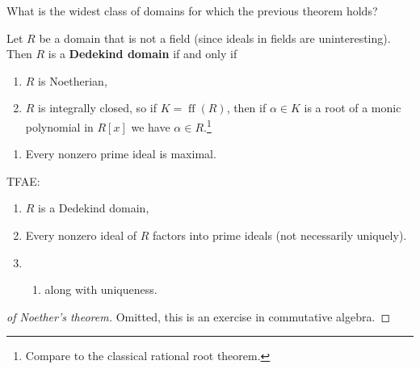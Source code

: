\begin{question}

What is the widest class of domains for which the previous theorem
holds?

\end{question}

\begin{definition}

Let \(R\) be a domain that is not a field (since ideals in fields are
uninteresting). Then \(R\) is a \textbf{Dedekind domain} if and only if

\begin{enumerate}
\def\labelenumi{\alph{enumi}.}
\item
  \(R\) is Noetherian,
\item
  \(R\) is integrally closed, so if \(K = \operatorname{ff}(R)\), then
  if \(\alpha\in K\) is a root of a monic polynomial in \(R[x]\) we have
  \(\alpha\in R\).\footnote{Compare to the classical rational root
    theorem.}
\end{enumerate}

\begin{enumerate}
\def\labelenumi{\alph{enumi}.}
\setcounter{enumi}{2}
\tightlist
\item
  Every nonzero prime ideal is maximal.
\end{enumerate}

\end{definition}

\begin{theorem}[Noether]

TFAE:

\begin{enumerate}
\def\labelenumi{\arabic{enumi}.}
\item
  \(R\) is a Dedekind domain,
\item
  Every nonzero ideal of \(R\) factors into prime ideals (not
  necessarily uniquely).
\item
  \begin{enumerate}
  \def\labelenumii{(\arabic{enumii})}
  \setcounter{enumii}{1}
  \tightlist
  \item
    along with uniqueness.
  \end{enumerate}
\end{enumerate}

\end{theorem}

\begin{proof}[of Noether's theorem]

Omitted, this is an exercise in commutative algebra.

\end{proof}

